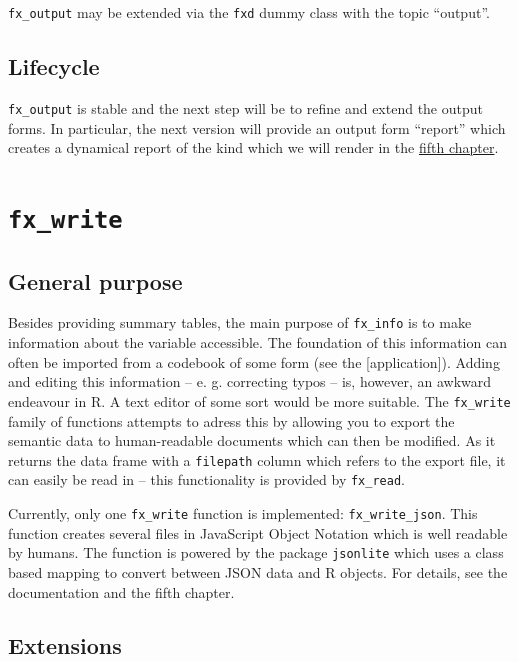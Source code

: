 \documentclass[]{report}
\theoremstyle{definition}
\theoremstyle{definition}
\theoremstyle{definition}
\theoremstyle{remark}
\begin{document}
\texttt{fx\_output} may be extended via the \texttt{fxd} dummy class
with the topic ``output''.

\subsection{Lifecycle}\label{lifecycle-2}

\texttt{fx\_output} is stable and the next step will be to refine and
extend the output forms. In particular, the next version will provide an
output form ``report'' which creates a dynamical report of the kind
which we will render in the \protect\hyperlink{application}{fifth
chapter}.

\section{\texorpdfstring{\texttt{fx\_write}}{fx\_write}}\label{fx_write}

\subsection{General purpose}\label{general-purpose-3}

Besides providing summary tables, the main purpose of \texttt{fx\_info}
is to make information about the variable accessible. The foundation of
this information can often be imported from a codebook of some form (see
the {[}application{]}). Adding and editing this information -- e. g.
correcting typos -- is, however, an awkward endeavour in R. A text
editor of some sort would be more suitable. The \texttt{fx\_write}
family of functions attempts to adress this by allowing you to export
the semantic data to human-readable documents which can then be
modified. As it returns the data frame with a \texttt{filepath} column
which refers to the export file, it can easily be read in -- this
functionality is provided by \texttt{fx\_read}.

Currently, only one \texttt{fx\_write} function is implemented:
\texttt{fx\_write\_json}. This function creates several files in
JavaScript Object Notation which is well readable by humans. The
function is powered by the package \texttt{jsonlite} \citep{jsonlite}
which uses a class based mapping to convert between JSON data and R
objects. For details, see the documentation and the fifth chapter.

\subsection{Extensions}\label{extensions-3}
\end{document}
